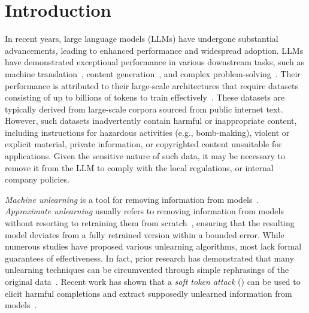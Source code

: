 \section{Introduction}\label{sec:introduction}
In recent years, large language models (LLMs) have undergone substantial advancements, leading to enhanced performance and widespread adoption.
LLMs have demonstrated exceptional performance in various downstream tasks, such as machine translation~\cite{zhu2023multilingual}, content generation~\cite{acharya2023llm}, and complex problem-solving~\cite{xi2025rise}.
Their performance is attributed to their large-scale architectures that require datasets consisting of up to billions of tokens to train effectively~\cite{kaplan2020scalinglaws}.
These datasets are typically derived from large-scale corpora sourced from public internet text.
However, such datasets inadvertently contain harmful or inappropriate content, including instructions for hazardous activities (e.g., bomb-making), violent or explicit material, private information, or copyrighted content unsuitable for applications.
Given the sensitive nature of such data, it may be necessary to remove it from the LLM to comply with the local regulations, or internal company policies.

\emph{Machine unlearning} is a tool for removing information from models~\cite{cao2015towards, bourtoule2021unlearning}.
\emph{Approximate unlearning} usually refers to removing information from models without resorting to retraining them from scratch~\cite{zhang2024right, eldan2023harrypotter, izzo2021approximate}, ensuring that the resulting model deviates from a fully retrained version within a bounded error.
While numerous studies have proposed various unlearning algorithms, most lack formal guarantees of effectiveness.
In fact, prior research has demonstrated that many unlearning techniques can be circumvented through simple rephrasings of the original data~\cite{shi2024muse}.
Recent work has shown that a \emph{soft token attack} (\sta) can be used to elicit harmful completions and extract supposedly unlearned information from models~\cite{schwinn2024soft,zou2024circuitbreakers}.

